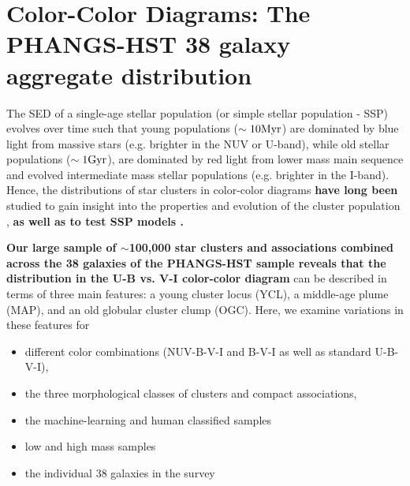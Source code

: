 \documentclass[linenumbers]{aastex63}
\begin{document}
\section{Color-Color Diagrams: The PHANGS-HST 38 galaxy aggregate distribution}\label{sect:color_color}
The SED of a single-age stellar population (or simple stellar population - SSP) evolves over time such that young populations ($\sim 10 {\rm Myr}$) are dominated by blue light from massive stars (e.g. brighter in the NUV or U-band), while old stellar populations ($\sim 1 {\rm Gyr}$), are dominated by red light from lower mass main sequence and evolved intermediate mass stellar populations (e.g. brighter in the I-band).  
Hence, the distributions of star clusters in color-color diagrams \textbf{have long been} studied to gain insight into the properties and evolution of the cluster population 
\citep[e.g.,][]{van_den_bergh_ubv_1968,searle_classification_1980,
girardi_age_1995, larsen_young_1999, chandar_luminosity_2010, adamo_legacy_2017}, 
\textbf{as well as to test SSP models \citep[e.g.,][]{bruzual_stellar_2003,vazquez_optimization_2005,maraston_evolutionary_1998}.}




\textbf{Our large sample of $\sim$100,000 star clusters and associations combined across the 38 galaxies of the PHANGS-HST sample reveals that the distribution in the U-B vs. V-I color-color diagram} %
can be described in terms of three main features: a young cluster locus (YCL), a middle-age plume (MAP), and an old globular cluster clump (OGC).   %
Here, we examine variations in these features for 
\begin{itemize}
\item different color combinations (NUV-B-V-I and B-V-I as well as standard U-B-V-I), 
\item the three morphological classes of clusters and compact associations, 
\item the machine-learning and human classified samples
\item low and high mass samples
\item the individual 38 galaxies in the survey
\end{itemize}
\end{document}
